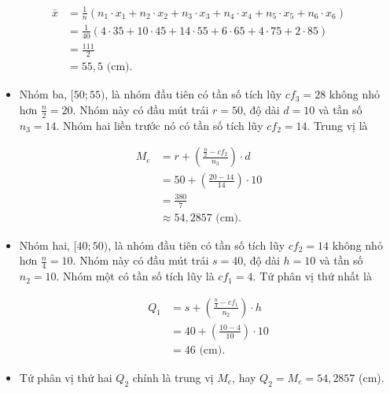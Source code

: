\documentclass[
  letterpaper,
  DIV=11,
  numbers=noendperiod]{scrartcl}
\providecommand{\tightlist}{%
  \setlength{\itemsep}{0pt}\setlength{\parskip}{0pt}}\usepackage{longtable,booktabs,array}
\begin{document}
\begin{align*}
    \bar{x}
        & = \frac{1}{n}(n_1\cdot x_1 + n_2\cdot x_2 + n_3\cdot x_3 + n_4\cdot x_4 + n_5\cdot x_5 + n_6\cdot x_6) \\
        & = \frac{1}{40} (4\cdot 35 + 10\cdot 45 + 14\cdot 55 + 6\cdot 65 + 4\cdot 75 + 2\cdot 85) \\
        & = \frac{111}{2} \\
        & = 55,5 \text{ (cm).}
\end{align*}

\begin{itemize}
\tightlist
\item
  Nhóm ba, \([50;55)\), là nhóm đầu tiên có tần số tích lũy \(cf_3=28\)
  không nhỏ hơn \(\frac{n}{2}=20\). Nhóm này có đầu mút trái \(r=50\),
  độ dài \(d=10\) và tần số \(n_3=14\). Nhóm hai liền trước nó có tần số
  tích lũy \(cf_2=14\). Trung vị là
\end{itemize}

\begin{align*}
M_e
    & = r + \left(\frac{\frac{n}{2}-cf_2}{n_3}\right)\cdot d \\
    & = 50 + \left(\frac{20-14}{14}\right)\cdot 10 \\
    & = \frac{380}{7} \\
    & \approx 54,2857 \text{ (cm).}
\end{align*}

\begin{itemize}
\item
  Nhóm hai, \([40;50)\), là nhóm đầu tiên có tần số tích lũy \(cf_2=14\)
  không nhỏ hơn \(\frac{n}{4}=10\). Nhóm này có đầu mút trái \(s=40\),
  độ dài \(h=10\) và tần số \(n_2=10\). Nhóm một có tần số tích lũy là
  \(cf_1=4\). Tứ phân vị thứ nhất là

  \begin{align*}
        Q_1
            & = s + \left( \frac{\frac{n}{4}-cf_1}{n_2}\right)\cdot h \\
            & = 40 + \left(\frac{10-4}{10}\right)\cdot 10 \\
            & = 46 \text{ (cm).}
    \end{align*}
\item
  Tứ phân vị thứ hai \(Q_2\) chính là trung vị \(M_e\), hay
  \(Q_2 = M_e = 54,2857\) (cm).
\end{itemize}
\end{document}
